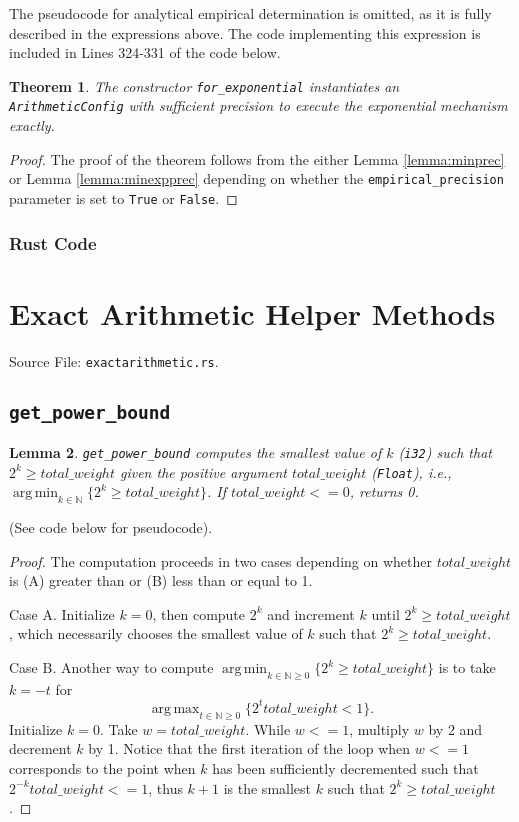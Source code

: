 \documentclass[11pt]{article}
\newtheorem{theorem}{Theorem}[section]
\newtheorem{lemma}[theorem]{Lemma}
\theoremstyle{definition}
\DeclareMathOperator*{\argmax}{arg\,max}
\DeclareMathOperator*{\argmin}{arg\,min}
\newcommand{\signed}[1]{{\tt i#1}}
\begin{document}
The pseudocode for analytical empirical determination is omitted, as it is fully described in the expressions above. The code implementing this expression is included in Lines 324-331 of the code below.

\begin{theorem}\label{thm:sufficientprecision}
The constructor  \texttt{for\_exponential} instantiates an {\tt ArithmeticConfig} with sufficient precision to execute the exponential mechanism exactly. 
\end{theorem}

\begin{proof}
The proof of the theorem follows from the either Lemma \ref{lemma:minprec} or Lemma \ref{lemma:minexpprec} depending on whether the {\tt empirical\_precision} parameter is set to {\tt True} or {\tt False}.
\end{proof}
\subsubsection{Rust Code}


\section{Exact Arithmetic Helper Methods}
Source File: \texttt{exactarithmetic.rs}.

\subsection{\texttt{get\_power\_bound}}
\begin{lemma}
\texttt{get\_power\_bound} computes the smallest value of $k$ (\signed{32}) such that $2^k \geq total\_weight$ given the positive argument $total\_weight$ ({\tt Float}), i.e., $\argmin_{k \in \mathbb{N}}\{2^k \geq total\_weight\}$. If $total\_weight <=0$, returns 0.
\end{lemma}
(See code below for pseudocode).
\begin{proof}
The computation proceeds in two cases depending on whether $total\_weight$ is (A) greater than or (B) less than or equal to 1.

Case A. Initialize $k = 0$, then compute $2^k$ and increment $k$ until $2^k \geq total\_weight$, which necessarily chooses the smallest value of $k$ such that $2^k \geq total\_weight$.

Case B. 
Another way to compute $\argmin_{k \in \mathbb{N} \geq 0}\{2^k \geq total\_weight\}$ is to take $k = -t$ for $$\argmax_{t \in \mathbb{N} \geq 0}\{2^t total\_weight < 1\}.$$
Initialize $k=0$. Take $w = total\_weight$. While $w <=1$, multiply $w$ by $2$ and decrement $k$ by 1. Notice that the first iteration of the loop when $w <=1 $ corresponds to the point when $k$ has been sufficiently decremented such that $2^{-k} total\_weight <= 1$, thus $k+1$ is the smallest $k$ such that $2^k \geq total\_weight$. 
\end{proof}
\end{document}
